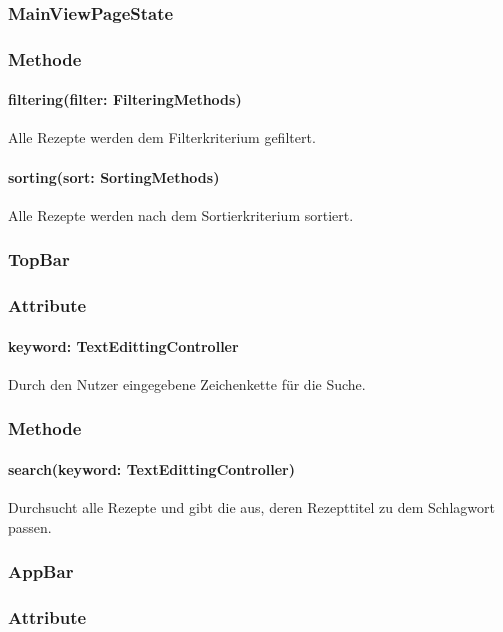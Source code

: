 \documentclass{entwurfsheft}
\begin{document}
\subsubsection{MainViewPageState}\label{sec:MainViewPageState}
\subsubsection*{Methode}

\paragraph*{filtering(filter: FilteringMethods)} Alle Rezepte werden dem Filterkriterium gefiltert.
\paragraph*{sorting(sort: SortingMethods)} Alle Rezepte werden nach dem Sortierkriterium sortiert.

\subsubsection{TopBar}\label{sec:TopBar}
\subsubsection*{Attribute}
\paragraph*{keyword: TextEdittingController} Durch den Nutzer eingegebene Zeichenkette für die Suche.

\subsubsection*{Methode}
\paragraph*{ search(keyword: TextEdittingController)} Durchsucht alle Rezepte und gibt die aus, deren Rezepttitel zu dem Schlagwort passen.


\subsubsection{AppBar} \label{sec:AppBar}
\subsubsection*{Attribute}
\end{document}
